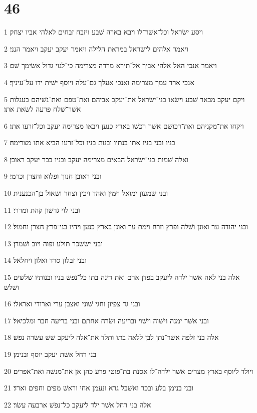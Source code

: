 \chapter{46}

\par 1 ויסע ישׂראל וכל־אשׁר־לו ויבא בארה שׁבע ויזבח זבחים לאלהי אביו יצחק׃
\par 2 ויאמר אלהים לישׂראל במראת הלילה ויאמר יעקב יעקב ויאמר הנני׃
\par 3 ויאמר אנכי האל אלהי אביך אל־תירא מרדה מצרימה כי־לגוי גדול אשׂימך שׁם׃
\par 4 אנכי ארד עמך מצרימה ואנכי אעלך גם־עלה ויוסף ישׁית ידו על־עיניך׃
\par 5 ויקם יעקב מבאר שׁבע וישׂאו בני־ישׂראל את־יעקב אביהם ואת־טפם ואת־נשׁיהם בעגלות אשׁר־שׁלח פרעה לשׂאת אתו׃
\par 6 ויקחו את־מקניהם ואת־רכושׁם אשׁר רכשׁו בארץ כנען ויבאו מצרימה יעקב וכל־זרעו אתו׃
\par 7 בניו ובני בניו אתו בנתיו ובנות בניו וכל־זרעו הביא אתו מצרימה׃
\par 8 ואלה שׁמות בני־ישׂראל הבאים מצרימה יעקב ובניו בכר יעקב ראובן׃
\par 9 ובני ראובן חנוך ופלוא וחצרן וכרמי׃
\par 10 ובני שׁמעון ימואל וימין ואהד ויכין וצחר ושׁאול בן־הכנענית׃
\par 11 ובני לוי גרשׁון קהת ומררי׃
\par 12 ובני יהודה ער ואונן ושׁלה ופרץ וזרח וימת ער ואונן בארץ כנען ויהיו בני־פרץ חצרן וחמול׃
\par 13 ובני ישׂשכר תולע ופוה ויוב ושׁמרן׃
\par 14 ובני זבלון סרד ואלון ויחלאל׃
\par 15 אלה בני לאה אשׁר ילדה ליעקב בפדן ארם ואת דינה בתו כל־נפשׁ בניו ובנותיו שׁלשׁים ושׁלשׁ׃
\par 16 ובני גד צפיון וחגי שׁוני ואצבן ערי וארודי ואראלי׃
\par 17 ובני אשׁר ימנה וישׁוה וישׁוי ובריעה ושׂרח אחתם ובני בריעה חבר ומלכיאל׃
\par 18 אלה בני זלפה אשׁר־נתן לבן ללאה בתו ותלד את־אלה ליעקב שׁשׁ עשׂרה נפשׁ׃
\par 19 בני רחל אשׁת יעקב יוסף ובנימן׃
\par 20 ויולד ליוסף בארץ מצרים אשׁר ילדה־לו אסנת בת־פוטי פרע כהן אן את־מנשׁה ואת־אפרים׃
\par 21 ובני בנימן בלע ובכר ואשׁבל גרא ונעמן אחי וראשׁ מפים וחפים וארד׃
\par 22 אלה בני רחל אשׁר ילד ליעקב כל־נפשׁ ארבעה עשׂר׃
